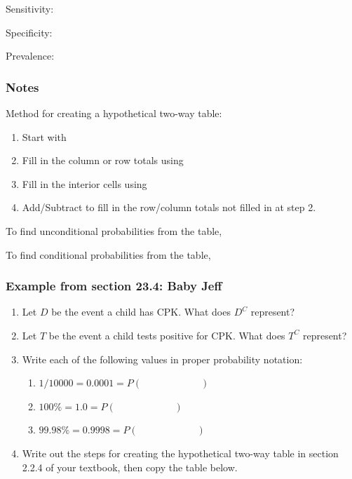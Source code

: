 \documentclass[
]{report}
\providecommand{\tightlist}{%
  \setlength{\itemsep}{0pt}\setlength{\parskip}{0pt}}
\newcommand{\rgs}{\vspace{12pt}} %
\newcommand{\rgi}{\hspace{24pt}}  %
\begin{document}
Sensitivity:
\rgs

Specificity:
\rgs

Prevalence:
\rgs

\hypertarget{notes-26}{%
\subsubsection*{Notes}\label{notes-26}}

Method for creating a hypothetical two-way table:

\begin{enumerate}
\def\labelenumi{\arabic{enumi}.}
\item
  Start with
  \rgs
\item
  Fill in the column or row totals using
  \rgs
\item
  Fill in the interior cells using
  \rgs
\item
  Add/Subtract to fill in the row/column totals not filled in at step 2.
\end{enumerate}

\rgi \rgi To find unconditional probabilities from the table,
\rgs

\rgi \rgi To find conditional probabilities from the table,
\rgs

\hypertarget{example-from-section-23.4-baby-jeff}{%
\subsubsection*{Example from section 23.4: Baby Jeff}\label{example-from-section-23.4-baby-jeff}}

\begin{enumerate}
\def\labelenumi{\arabic{enumi}.}
\item
  Let \(D\) be the event a child has CPK. What does \(D^C\) represent?
  \rgs
\item
  Let \(T\) be the event a child tests positive for CPK. What does \(T^C\) represent?
  \rgs
\item
  Write each of the following values in proper probability notation:

  \begin{enumerate}
  \def\labelenumii{\alph{enumii}.}
  \tightlist
  \item
    \(1/10000 = 0.0001 = P( \hspace{1in} )\)
  \item
    \(100\% = 1.0 = P( \hspace{1in} )\)
  \item
    \(99.98\% = 0.9998 = P( \hspace{1in} )\)
  \end{enumerate}
\item
  Write out the steps for creating the hypothetical two-way table in section 2.2.4 of your textbook, then copy the table below.
\end{enumerate}
\end{document}

